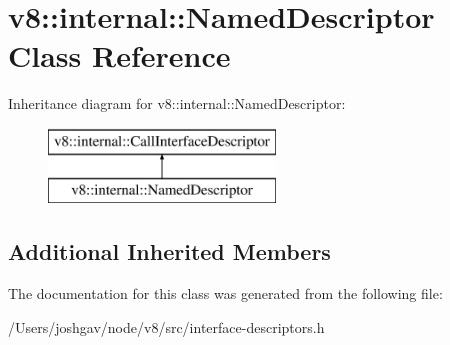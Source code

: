 \hypertarget{classv8_1_1internal_1_1_named_descriptor}{}\section{v8\+:\+:internal\+:\+:Named\+Descriptor Class Reference}
\label{classv8_1_1internal_1_1_named_descriptor}
Inheritance diagram for v8\+:\+:internal\+:\+:Named\+Descriptor\+:\begin{figure}[H]
\begin{center}
\leavevmode
\includegraphics[height=2.000000cm]{classv8_1_1internal_1_1_named_descriptor}
\end{center}
\end{figure}
\subsection*{Additional Inherited Members}


The documentation for this class was generated from the following file\+:\begin{DoxyCompactItemize}
\item 
/\+Users/joshgav/node/v8/src/interface-\/descriptors.\+h\end{DoxyCompactItemize}
